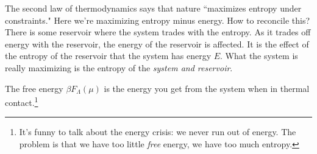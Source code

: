 \documentclass[12pt]{book}
\theoremstyle{norm}
\begin{document}
The second law of thermodynamics says that nature ``maximizes entropy under constraints." %
Here we're maximizing entropy minus energy. How to reconcile this? 
There is some reservoir where the system trades with the entropy. As it trades off energy with the reservoir, the energy of the reservoir is affected. It is the effect of the entropy of the reservoir that the system has energy $E$. What the system is really maximizing is the entropy of the \emph{system and reservoir}.

The free energy $\beta F_{\Lambda}(\mu)$ is the energy you get from the system when in thermal contact.\footnote{It's funny to talk about the energy crisis: we never run out of energy. The problem is that we have too little \emph{free} energy, we have too much entropy.}

\end{document}
